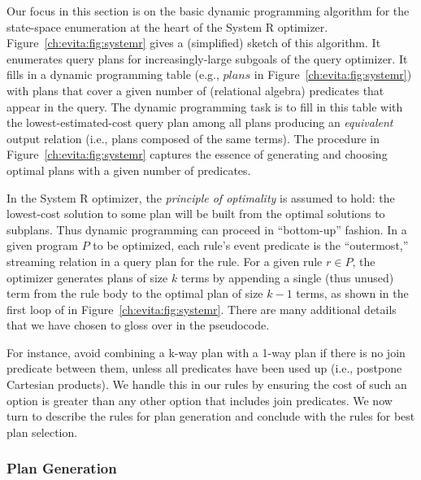 Our focus in this section is on the basic dynamic programming algorithm for the
state-space enumeration at the heart of the System R optimizer.
Figure~\ref{ch:evita:fig:systemr} gives a (simplified) sketch of this
algorithm.  It enumerates query plans for increasingly-large subgoals of the
query optimizer.  It fills in a dynamic programming table (e.g., $plans$ in
Figure~\ref{ch:evita:fig:systemr}) with plans that cover a given number of
(relational algebra) predicates that appear in the query.  The dynamic
programming task is to fill in this table with the lowest-estimated-cost query
plan among all plans producing an {\em equivalent} output relation (i.e., plans
composed of the same terms).  The  procedure in
Figure~\ref{ch:evita:fig:systemr} captures the essence of generating and
choosing optimal plans with a given number of predicates.

In the System R optimizer, the {\em principle of optimality} is assumed to hold: the
lowest-cost solution to some plan will be built from the optimal solutions to
subplans.  Thus dynamic programming can proceed in ``bottom-up'' fashion.  In a
given program $P$ to be optimized, each rule's event predicate is the
``outermost,'' streaming relation in a query plan for the rule.  For a given
rule $r \in P$, the optimizer generates plans of size $k$ terms by appending a
single (thus unused) term from the rule body to the optimal plan of size $k-1$
terms, as shown in the first loop of  in Figure~\ref{ch:evita:fig:systemr}.
There are many additional details that we have chosen to gloss over in the
pseudocode.  

For instance, avoid combining a k-way plan with a 1-way plan if there is no
join predicate between them, unless all predicates have been used up (i.e.,
postpone Cartesian products).  We handle this in our \OVERLOG rules by ensuring
the cost of such an option is greater than any other option that includes join
predicates.  We now turn to describe the \OVERLOG rules for plan generation and
conclude with the rules for best plan selection.

\subsubsection{Plan Generation}
\label{ch:evita:sec:plangen}

